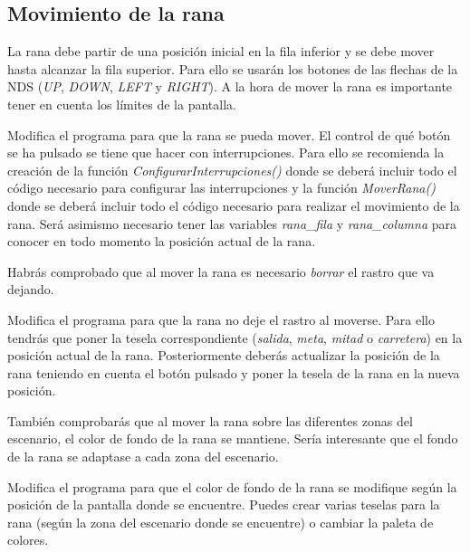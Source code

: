 \subsection{Movimiento de la rana}
La rana debe partir de una posición inicial en la fila inferior y se debe mover hasta alcanzar la fila superior. Para ello se usarán los botones de las flechas de la NDS (\textit{UP}, \textit{DOWN}, \textit{LEFT} y \textit{RIGHT}). A la hora de mover la rana es importante tener en cuenta los límites de la pantalla.

\begin{exercise}
	Modifica el programa para que la rana se pueda mover. El control de qué botón se ha pulsado se tiene que hacer con interrupciones. Para ello se recomienda la creación de la función \textit{ConfigurarInterrupciones()} donde se deberá incluir todo el código necesario para configurar las interrupciones y la función \textit{MoverRana()} donde se deberá incluir todo el código necesario para realizar el movimiento de la rana. Será asimismo necesario tener las variables  \textit{rana\_fila} y \textit{rana\_columna} para conocer en todo momento la posición actual de la rana.
\end{exercise}


Habrás comprobado que al mover la rana es necesario \textit{borrar} el rastro que va dejando. 
	
\begin{exercise}
  Modifica el programa para que la rana no deje el rastro al moverse. Para ello tendrás que poner la tesela correspondiente (\textit{salida}, \textit{meta}, \textit{mitad} o \textit{carretera}) en la posición actual de la rana. Posteriormente deberás actualizar la posición de la rana teniendo en cuenta el botón pulsado y poner la tesela de la rana en la nueva posición.
\end{exercise}	

También comprobarás que al mover la rana sobre las diferentes zonas del escenario, el color de fondo de la rana se mantiene. Sería interesante que el fondo de la rana se adaptase a cada zona del escenario.
	
\begin{exercise}
 Modifica el programa para que el color de fondo de la rana se modifique según la posición de la pantalla donde se encuentre. Puedes crear varias teselas para la rana (según la zona del escenario donde se encuentre) o cambiar la paleta de colores.
\end{exercise}	
	
